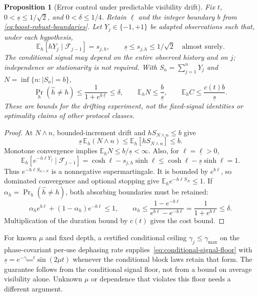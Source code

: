 \documentclass[11pt,a4paper]{article}
\newcommand{\E}{\mathbb E}
\newtheorem{proposition}[theorem]{Proposition}
\theoremstyle{definition}
\theoremstyle{remark}
\numberwithin{equation}{section}
\begin{document}
\begin{proposition}[Error control under predictable visibility drift]
\label{prop:drifting-visibility}
Fix $t$, $0<\underline s\leq1/\sqrt2$, and $0<\delta\leq1/4$.
Retain $\underline\ell$ and the integer boundary $b$ from
\eqref{eq:boost-robust-boundaries}. Let $Y_j\in\{-1,+1\}$ be adapted
observations such that, under each hypothesis,
\begin{equation}\label{eq:conditional-signal-floor}
 \E_h[hY_j\mid\mathcal F_{j-1}]=s_{j,h},\qquad
 \underline s\leq s_{j,h}\leq1/\sqrt2\quad\text{almost surely}.
\end{equation}
The conditional signal may depend on the entire observed history and
on $j$; independence or stationarity is not required. With
$S_n=\sum_{j=1}^nY_j$ and $N=\inf\{n:|S_n|=b\}$,
\begin{equation}\label{eq:drifting-visibility}
 \Pr_h(\widehat h\ne h)\leq\frac1{1+e^{b\underline\ell}}\leq\delta,
 \qquad
 \E_hN\leq\frac b{\underline s},\qquad
 \E_h C\leq\frac{c(t)b}{\underline s}.
\end{equation}
These are bounds for the drifting experiment, not the fixed-signal
identities or optimality claims of other protocol classes.
\end{proposition}
\begin{proof}
At $N\wedge n$, bounded-increment drift and $hS_{N\wedge n}\leq b$
give
\[
 \underline s\,\E_h(N\wedge n)
 \leq\E_h[hS_{N\wedge n}]\leq b.
\]
Monotone convergence implies $\E_hN\leq b/\underline s<\infty$.
Also, for $\ell=\underline\ell>0$,
\[
 \E_h[e^{-h\ell Y_j}\mid\mathcal F_{j-1}]
 =\cosh\ell-s_{j,h}\sinh\ell
 \leq\cosh\ell-\underline s\sinh\ell=1.
\]
Thus $e^{-h\ell S_{n\wedge N}}$ is a nonnegative supermartingale.
It is bounded by $e^{b\ell}$, so dominated convergence and optional
stopping give $\E_h e^{-h\ell S_N}\leq1$. If
$\alpha_h=\Pr_h(\widehat h\ne h)$, both absorbing boundaries must be
retained:
\[
 \alpha_h e^{b\ell}+(1-\alpha_h)e^{-b\ell}\leq1,
 \qquad
 \alpha_h\leq\frac{1-e^{-b\ell}}{e^{b\ell}-e^{-b\ell}}
 =\frac1{1+e^{b\ell}}\leq\delta.
\]
Multiplication of the duration bound by $c(t)$ gives the cost bound.
\end{proof}

For known $\mu$ and fixed depth, a certified conditional ceiling
$\gamma_j\leq\gamma_{\max}$ on the phase-covariant per-use dephasing
rate supplies~\eqref{eq:conditional-signal-floor} with
$\underline s=e^{-\gamma_{\max}t}\sin(2\mu t)$ whenever the conditional
block laws retain that form. The guarantee follows from the conditional
signal floor, not from a bound on average visibility alone. Unknown
$\mu$ or dependence that violates this floor needs a different argument.
\end{document}
